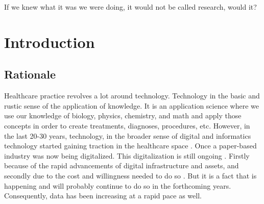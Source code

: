\begin{savequote}[75mm]
If we knew what it was we were doing, it would not be called research, would it?
\end{savequote}
\chapter{Introduction} \label{chap:intro}

\section{Rationale}
Healthcare practice revolves a lot around technology. Technology in the basic and rustic sense of the application of knowledge. It is an application science where we use our knowledge of biology, physics, chemistry, and math and apply those concepts in order to create treatments, diagnoses, procedures, etc.
However, in the last 20-30 years, technology, in the broader sense of digital and informatics technology started gaining traction in the healthcare space \cite{adler-milsteinHITECHActDrove2017}. Once a paper-based industry was now being digitalized. This digitalization is still ongoing \cite{abul-husnPersonalizedMedicinePower2019}. Firstly because of the rapid advancements of digital infrastructure and assets, and secondly due to the cost and willingness needed to do so \cite{kruseUseElectronicHealth2018,palabindalaAdoptionElectronicHealth2016}. But it is a fact that is happening and will probably continue to do so in the forthcoming years. Consequently, data has been increasing at a rapid pace as well. 

